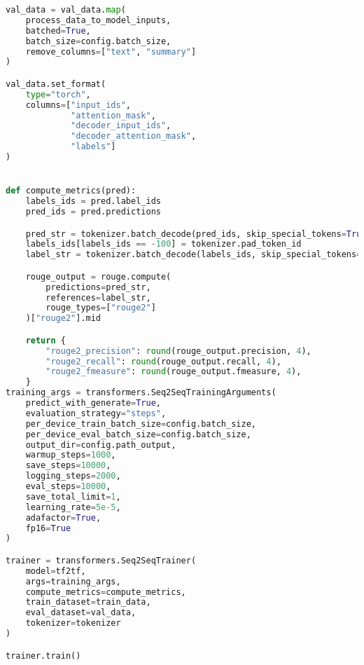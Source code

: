 \begin{lstlisting}[language=Python, caption=Trainingscode]
val_data = val_data.map(
    process_data_to_model_inputs,
    batched=True,
    batch_size=config.batch_size,
    remove_columns=["text", "summary"]
)

val_data.set_format(
    type="torch",
    columns=["input_ids",
             "attention_mask",
             "decoder_input_ids",
             "decoder_attention_mask",
             "labels"]
)


def compute_metrics(pred):
    labels_ids = pred.label_ids
    pred_ids = pred.predictions

    pred_str = tokenizer.batch_decode(pred_ids, skip_special_tokens=True)
    labels_ids[labels_ids == -100] = tokenizer.pad_token_id
    label_str = tokenizer.batch_decode(labels_ids, skip_special_tokens=True)

    rouge_output = rouge.compute(
        predictions=pred_str,
        references=label_str,
        rouge_types=["rouge2"]
    )["rouge2"].mid

    return {
        "rouge2_precision": round(rouge_output.precision, 4),
        "rouge2_recall": round(rouge_output.recall, 4),
        "rouge2_fmeasure": round(rouge_output.fmeasure, 4),
    }
training_args = transformers.Seq2SeqTrainingArguments(
    predict_with_generate=True,
    evaluation_strategy="steps",
    per_device_train_batch_size=config.batch_size,
    per_device_eval_batch_size=config.batch_size,
    output_dir=config.path_output,
    warmup_steps=1000,
    save_steps=10000,
    logging_steps=2000,
    eval_steps=10000,
    save_total_limit=1,
    learning_rate=5e-5,
    adafactor=True,
    fp16=True
)

trainer = transformers.Seq2SeqTrainer(
    model=tf2tf,
    args=training_args,
    compute_metrics=compute_metrics,
    train_dataset=train_data,
    eval_dataset=val_data,
    tokenizer=tokenizer
)

trainer.train()
\end{lstlisting}
\newpage


